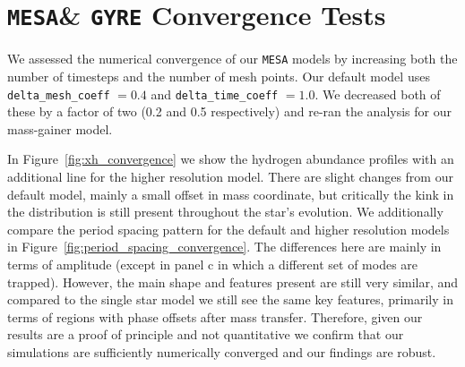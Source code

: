 \documentclass[twocolumn, twocolappendix, oneside]{aastex631}
\newcommand{\mesa}{\texttt{MESA}\xspace}
\newcommand{\gyre}{\texttt{GYRE}\xspace}
\begin{document}
\section{\mesa \& \gyre Convergence Tests}\label{app:res_tests}

We assessed the numerical convergence of our \mesa models by increasing both the number of timesteps and the number of mesh points. Our default model uses \texttt{delta\_mesh\_coeff} $ = 0.4$ and \texttt{delta\_time\_coeff} $ = 1.0$. We decreased both of these by a factor of two (0.2 and 0.5 respectively) and re-ran the analysis for our mass-gainer model.

In Figure~\ref{fig:xh_convergence} we show the hydrogen abundance profiles with an additional line for the higher resolution model. There are slight changes from our default model, mainly a small offset in mass coordinate, but critically the kink in the distribution is still present throughout the star's evolution. We additionally compare the period spacing pattern for the default and higher resolution models in Figure~\ref{fig:period_spacing_convergence}. The differences here are mainly in terms of amplitude (except in panel c in which a different set of modes are trapped). However, the main shape and features present are still very similar, and compared to the single star model we still see the same key features, primarily in terms of regions with phase offsets after mass transfer. Therefore, given our results are a proof of principle and not quantitative we confirm that our simulations are sufficiently numerically converged and our findings are robust.
\end{document}
